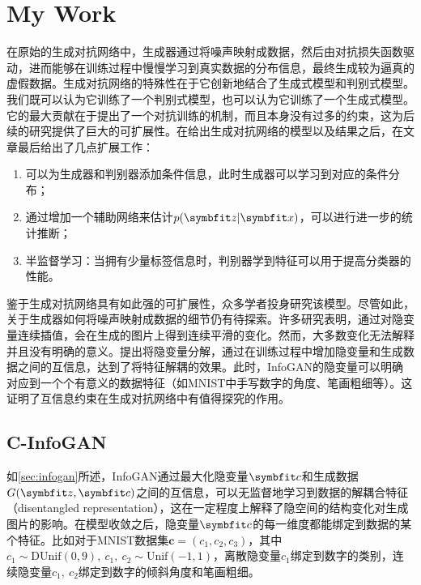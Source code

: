 \chapter{My Work}\label{chap:c-infogan}
在原始的生成对抗网络中，生成器通过将噪声映射成数据，然后由对抗损失函数驱动，进而能够在训练过程中慢慢学习到真实数据的分布信息，最终生成较为逼真的虚假数据。生成对抗网络的特殊性在于它创新地结合了生成式模型和判别式模型。我们既可以认为它训练了一个判别式模型，也可以认为它训练了一个生成式模型。它的最大贡献在于提出了一个对抗训练的机制，而且本身没有过多的约束，这为后续的研究提供了巨大的可扩展性。\citet{goodfellow2014generative}在给出生成对抗网络的模型以及结果之后，在文章最后给出了几点扩展工作：
\begin{enumerate}
  \item 可以为生成器和判别器添加条件信息，此时生成器可以学习到对应的条件分布；
  \item 通过增加一个辅助网络来估计$p(\bd{z}|\bd{x})$，可以进行进一步的统计推断；
  \item 半监督学习：当拥有少量标签信息时，判别器学到特征可以用于提高分类器的性能。
\end{enumerate}

鉴于生成对抗网络具有如此强的可扩展性，众多学者投身研究该模型\citep{mirza2014conditional,radford2015unsupervised,chen2016infogan,chongxuan2017triple,mao2017least}。尽管如此，关于生成器如何将噪声映射成数据的细节仍有待探索。许多研究表明，通过对隐变量连续插值，会在生成的图片上得到连续平滑的变化\citep{radford2015unsupervised,chen2016infogan,dumoulin2016adversarially,miyato2018cgans}。然而，大多数变化无法解释并且没有明确的意义。\citet{chen2016infogan}提出将隐变量分解，通过在训练过程中增加隐变量和生成数据之间的互信息，达到了将特征解耦的效果。此时，InfoGAN的隐变量可以明确对应到一个个有意义的数据特征（如MNIST中手写数字的角度、笔画粗细等）。这证明了互信息约束在生成对抗网络中有值得探究的作用。

\section{C-InfoGAN}\label{sec:c-infogan}
如\ref{sec:infogan}所述，InfoGAN通过最大化隐变量$\bd{c}$和生成数据$G(\bd{z}, \bd{c})$之间的互信息，可以无监督地学习到数据的解耦合特征（disentangled representation），这在一定程度上解释了隐空间的结构变化对生成图片的影响。在模型收敛之后，隐变量$\bd{c}$的每一维度都能绑定到数据的某个特征。比如对于MNIST数据集$\mathbf{c} = (c_1, c_2, c_3)$，其中$c_1 \sim \text{DUnif}(0,9), ~c_1,~c_2 \sim \text{Unif}(-1,1)$，离散隐变量$c_1$绑定到数字的类别，连续隐变量$c_1, ~c_2$绑定到数字的倾斜角度和笔画粗细。

